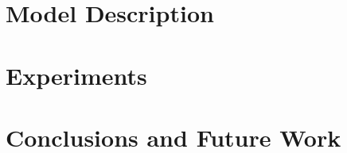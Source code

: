 \documentclass[10pt,twocolumn,letterpaper]{article}
\newcommand{\+}[1]{\ensuremath{{\boldsymbol #1}}}
\begin{document}
\section{Model Description} \label{sec:model} 
%
%
\section{Experiments} \label{sec:experiments} 
%
%
\section{Conclusions and Future Work} \label{sec:conclusions} 

{\small


}
\end{document}
